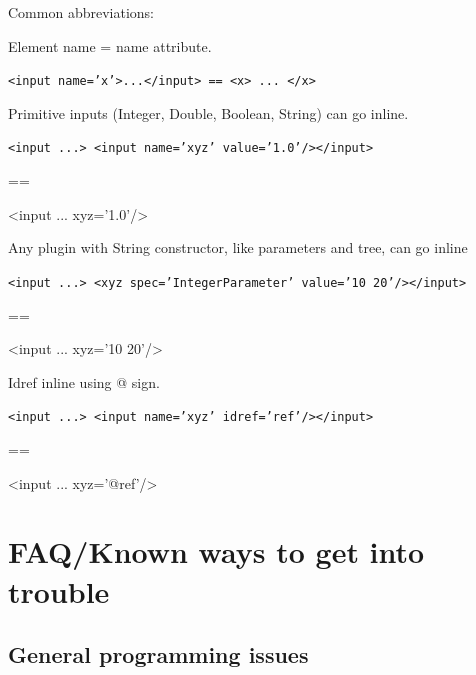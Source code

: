 \documentclass{article}
\begin{document}
Common abbreviations:


Element name = name attribute.

{\color{blue}\tt <input name='x'>...</input> == <x> ... </x>}

Primitive inputs (Integer, Double, Boolean, String) can go inline.

{\color{blue}\tt <input ...> <input name='xyz' value='1.0'/></input> 

== 

<input ... xyz='1.0'/>}

Any plugin with String constructor, like parameters and tree, can go inline

{\color{blue}\tt <input ...> <xyz spec='IntegerParameter' value='10 20'/></input> 

== 

<input ... xyz='10 20'/>}

Idref inline using @ sign.

{\color{blue}\tt <input ...> <input name='xyz' idref='ref'/></input> 

== 

<input ... xyz='@ref'/>}










\section{FAQ/Known ways to get into trouble\label{sec.faq}}

\subsection{General programming issues}
\end{document}
